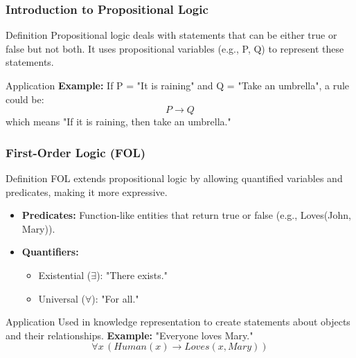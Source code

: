 \documentclass[aspectratio=169]{beamer}
\begin{document}
\begin{frame}[fragile]
    \frametitle{Introduction to Propositional Logic}
    \begin{block}{Definition}
        Propositional logic deals with statements that can be either true or false but not both. It uses propositional variables (e.g., P, Q) to represent these statements.
    \end{block}
    
    \begin{block}{Application}
        \textbf{Example:}
        If P = "It is raining" and Q = "Take an umbrella", a rule could be: 
        \begin{equation}
            P \rightarrow Q
        \end{equation}
        which means "If it is raining, then take an umbrella."
    \end{block}
\end{frame}

\begin{frame}[fragile]
    \frametitle{First-Order Logic (FOL)}
    \begin{block}{Definition}
        FOL extends propositional logic by allowing quantified variables and predicates, making it more expressive.
    \end{block}
    
    \begin{itemize}
        \item \textbf{Predicates:} Function-like entities that return true or false (e.g., Loves(John, Mary)).
        \item \textbf{Quantifiers:}
        \begin{itemize}
            \item Existential ($\exists$): "There exists."
            \item Universal ($\forall$): "For all."
        \end{itemize}
    \end{itemize}

    \begin{block}{Application}
        Used in knowledge representation to create statements about objects and their relationships.
        \textbf{Example:} "Everyone loves Mary."
        \begin{equation}
            \forall x \, (Human(x) \rightarrow Loves(x, Mary))
        \end{equation}
    \end{block}
\end{frame}
\end{document}
